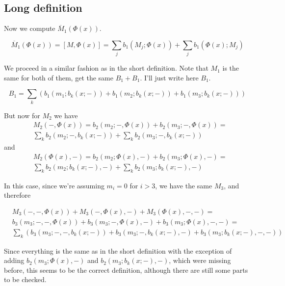 \documentclass[twoside]{article}
\begin{document}
\subsection{Long definition}

Now we compute $\overline{M}_1(\Phi(x))$.

$$\overline{M}_1(\Phi(x))=[M,\Phi(x)]=\sum_j b_1(M_j;\Phi(x))+\sum_j b_1(\Phi(x);M_j)$$

We proceed in a similar fashion as in the short definition. Note that $M_1$ is the same for both of them, get the same $B_1+B_1$. I'll just write here $B_1$.

$$B_1=\sum_k(b_1(m_1;b_k(x;-))+b_1(m_2;b_k(x;-))+b_1(m_3;b_k(x;-)))$$

But now for $M_2$ we have 
\begin{align*}
&M_2(-,\Phi(x))=b_2(m_2;-,\Phi(x))+b_2(m_3;-,\Phi(x))=\\
&\sum_k b_2(m_2; -,b_k(x;-))+\sum_k b_2(m_3;-,b_k(x;-))
\end{align*}
and
\begin{align*}
&M_2(\Phi(x),-)=b_2(m_2;\Phi(x),-)+b_2(m_3;\Phi(x),-)=\\
&\sum_k b_2(m_2;b_k(x;-),-)+\sum_k b_2(m_3;b_k(x;-),-)
\end{align*}

In this case, since we're assuming $m_i=0$ for $i>3$, we have the same $M_3$, and therefore 

\begin{align*}
&M_3(-,-,\Phi(x))+M_3(-,\Phi(x),-)+M_3(\Phi(x),-,-)=\\
&b_3(m_3;-,-,\Phi(x))+b_3(m_3;-,\Phi(x),-)+b_3(m_3;\Phi(x),-,-)=\\
&\sum_k (b_3(m_3; -,-,b_k(x;-))+ b_3(m_3;-,b_k(x;-),-)+b_3(m_3;b_k(x;-),-,-))
\end{align*}

Since everything is the same as in the short definition with the exception of adding $b_2(m_3;\Phi(x),-)$ and $b_2(m_3;b_k(x;-),-)$, which were missing before, this seems to be the correct definition, although there are still some parts to be checked.
\end{document}
